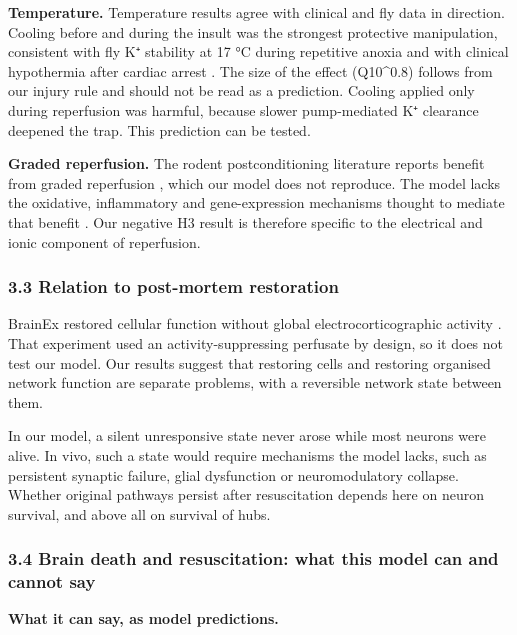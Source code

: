 \documentclass[11pt]{article}
\begin{document}
\textbf{Temperature.} Temperature results agree with clinical and fly data in direction. Cooling before and during the insult was the strongest protective manipulation, consistent with fly K⁺ stability at 17 °C during repetitive anoxia \cite{rodriguez2012} and with clinical hypothermia after cardiac arrest \cite{haca2002,bernard2002,erecinska2003}. The size of the effect (Q10\^{}0.8) follows from our injury rule and should not be read as a prediction. Cooling applied only during reperfusion was harmful, because slower pump-mediated K⁺ clearance deepened the trap. This prediction can be tested.

\textbf{Graded reperfusion.} The rodent postconditioning literature reports benefit from graded reperfusion \cite{gao2008,zhao2009}, which our model does not reproduce. The model lacks the oxidative, inflammatory and gene-expression mechanisms thought to mediate that benefit \cite{eltzschig2011,caraballo2014,vigne2009}. Our negative H3 result is therefore specific to the electrical and ionic component of reperfusion.

\subsubsection{3.3 Relation to post-mortem restoration}\label{relation-to-post-mortem-restoration}

BrainEx restored cellular function without global electrocorticographic activity \cite{vrselja2019}. That experiment used an activity-suppressing perfusate by design, so it does not test our model. Our results suggest that restoring cells and restoring organised network function are separate problems, with a reversible network state between them.

In our model, a silent unresponsive state never arose while most neurons were alive. In vivo, such a state would require mechanisms the model lacks, such as persistent synaptic failure, glial dysfunction or neuromodulatory collapse. Whether original pathways persist after resuscitation depends here on neuron survival, and above all on survival of hubs.

\subsubsection{3.4 Brain death and resuscitation: what this model can and cannot say}\label{brain-death-and-resuscitation-what-this-model-can-and-cannot-say}

\textbf{What it can say, as model predictions.}
\end{document}
